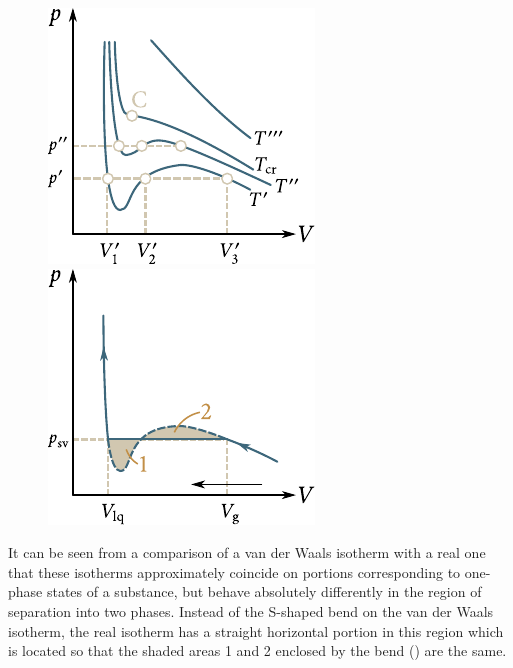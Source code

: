 \begin{figure}[t]
	\begin{minipage}[t]{0.5\linewidth}
		\begin{center}
			\includegraphics[scale=1]{figures/ch_15/fig_15_8.pdf}
			\caption[]{}
			\label{fig:15_8}
		\end{center}
	\end{minipage}
	\hspace{-0.05cm}
	\begin{minipage}[t]{0.5\linewidth}
		\begin{center}
			\includegraphics[scale=1]{figures/ch_15/fig_15_9.pdf}
			\caption[]{}
			\label{fig:15_9}
		\end{center}
	\end{minipage}
	\vspace{-0.4cm}
\end{figure}

It can be seen from a comparison of a van der Waals isotherm with a real one that these isotherms approximately coincide on portions corresponding to one-phase states of a substance, but behave absolutely differently in the region of separation into two phases. Instead of the S-shaped bend on the van der Waals isotherm, the real isotherm has a straight horizontal portion in this region which is located so that the shaded areas 1 and 2 enclosed by the bend () are the same.

